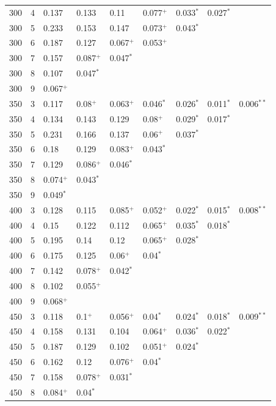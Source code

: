 \documentclass[12pt,]{article}
\begin{document}
\begin{longtable}{rrlllllll}
300 & 4 & 0.137 & 0.133 & 0.11 & 0.077$^+$ & 0.033$^*$ & 0.027$^*$ & \\
300 & 5 & 0.233 & 0.153 & 0.147 & 0.073$^+$ & 0.043$^*$ &  & \\
300 & 6 & 0.187 & 0.127 & 0.067$^+$ & 0.053$^+$ &  &  & \\
300 & 7 & 0.157 & 0.087$^+$ & 0.047$^*$ &  &  &  & \\
300 & 8 & 0.107 & 0.047$^*$ &  &  &  &  & \\
300 & 9 & 0.067$^+$ &  &  &  &  &  & \\
350 & 3 & 0.117 & 0.08$^+$ & 0.063$^+$ & 0.046$^*$ & 0.026$^*$ & 0.011$^*$ & 0.006$^{**}$\\
350 & 4 & 0.134 & 0.143 & 0.129 & 0.08$^+$ & 0.029$^*$ & 0.017$^*$ & \\
350 & 5 & 0.231 & 0.166 & 0.137 & 0.06$^+$ & 0.037$^*$ &  & \\
350 & 6 & 0.18 & 0.129 & 0.083$^+$ & 0.043$^*$ &  &  & \\
350 & 7 & 0.129 & 0.086$^+$ & 0.046$^*$ &  &  &  & \\
350 & 8 & 0.074$^+$ & 0.043$^*$ &  &  &  &  & \\
350 & 9 & 0.049$^*$ &  &  &  &  &  & \\
400 & 3 & 0.128 & 0.115 & 0.085$^+$ & 0.052$^+$ & 0.022$^*$ & 0.015$^*$ & 0.008$^{**}$\\
400 & 4 & 0.15 & 0.122 & 0.112 & 0.065$^+$ & 0.035$^*$ & 0.018$^*$ & \\
400 & 5 & 0.195 & 0.14 & 0.12 & 0.065$^+$ & 0.028$^*$ &  & \\
400 & 6 & 0.175 & 0.125 & 0.06$^+$ & 0.04$^*$ &  &  & \\
400 & 7 & 0.142 & 0.078$^+$ & 0.042$^*$ &  &  &  & \\
400 & 8 & 0.102 & 0.055$^+$ &  &  &  &  & \\
400 & 9 & 0.068$^+$ &  &  &  &  &  & \\
450 & 3 & 0.118 & 0.1$^+$ & 0.056$^+$ & 0.04$^*$ & 0.024$^*$ & 0.018$^*$ & 0.009$^{**}$\\
450 & 4 & 0.158 & 0.131 & 0.104 & 0.064$^+$ & 0.036$^*$ & 0.022$^*$ & \\
450 & 5 & 0.187 & 0.129 & 0.102 & 0.051$^+$ & 0.024$^*$ &  & \\
450 & 6 & 0.162 & 0.12 & 0.076$^+$ & 0.04$^*$ &  &  & \\
450 & 7 & 0.158 & 0.078$^+$ & 0.031$^*$ &  &  &  & \\
450 & 8 & 0.084$^+$ & 0.04$^*$ &  &  &  &  & \\

\end{longtable}
\end{document}
